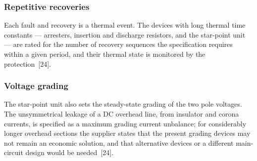 \subsubsection{Repetitive recoveries}
\label{sec:dcf-ratings-thermal}

Each fault and recovery is a thermal event. The devices with long thermal
time constants --- arresters, insertion and discharge resistors, and the
star-point unit --- are rated for the number of recovery sequences the
specification requires within a given period, and their thermal state is
monitored by the protection~[24].

\subsubsection{Voltage grading}
\label{sec:dcf-ratings-grading}

The star-point unit also sets the steady-state grading of the two pole
voltages. The unsymmetrical leakage of a DC overhead line, from insulator
and corona currents, is specified as a maximum grading current unbalance;
for considerably longer overhead sections the supplier states that the
present grading devices may not remain an economic solution, and that
alternative devices or a different main-circuit design would be
needed~[24].

\FloatBarrier

